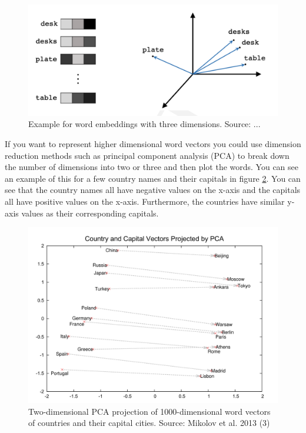 \documentclass[]{krantz}
\begin{document}
\begin{figure}
\includegraphics[width=\textwidth]{figures/01-01-foundations-applications-of-modern-NLP/01-01_word_embeddings_1} \caption{Example for word embeddings with three dimensions. Source: ...}\label{fig:word-embedding1}
\end{figure}

If you want to represent higher dimensional word vectors you could use dimension reduction methods such as principal component analysis (PCA) to break down the number of dimensions into two or three and then plot the words. You can see an example of this for a few country names and their capitals in figure \ref{fig:word-embedding2}. You can see that the country names all have negative values on the x-axis and the capitals all have positive values on the x-axis. Furthermore, the countries have similar y-axis values as their corresponding capitals.

\begin{figure}
\includegraphics[width=\textwidth]{figures/01-01-foundations-applications-of-modern-NLP/01-01_word_embeddings_2} \caption{Two-dimensional PCA projection of 1000-dimensional word vectors of countries and their capital cities. Source: Mikolov et al. 2013 (3)}\label{fig:word-embedding2}
\end{figure}
\end{document}
